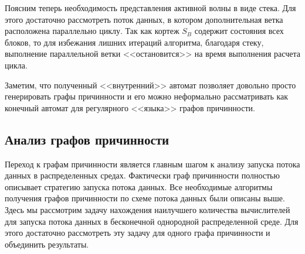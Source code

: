 \documentclass[10pt,a4paper]{article}
\begin{document}
  Поясним теперь необходимость представления активной волны в виде стека. Для этого достаточно рассмотреть поток данных, в котором дополнительная ветка расположена параллельно циклу.
  Так как кортеж $S_B$ содержит состояния всех блоков, то для избежания лишних итераций алгоритма, благодаря стеку, выполнение параллельной ветки <<остановится>> на время выполнения
  расчета цикла.
  
  Заметим, что полученный <<внутренний>> автомат позволяет довольно просто генерировать графы причинности и его можно неформально рассматривать
  как конечный автомат для регулярного <<языка>> графов причинности.

\subsection{Анализ графов причинности}
  Переход к графам причинности является главным шагом к анализу запуска потока данных в распределенных средах.
  Фактически граф причинности полностью описывает стратегию запуска потока данных. Все необходимые алгоритмы получения графов причинности по схеме потока данных
  были описаны выше. Здесь мы рассмотрим задачу нахождения наилучшего количества вычислителей для
  запуска потока данных в бесконечной однородной распределенной среде. Для этого достаточно рассмотреть эту задачу для одного графа причинности и объединить результаты.
  
\end{document}
